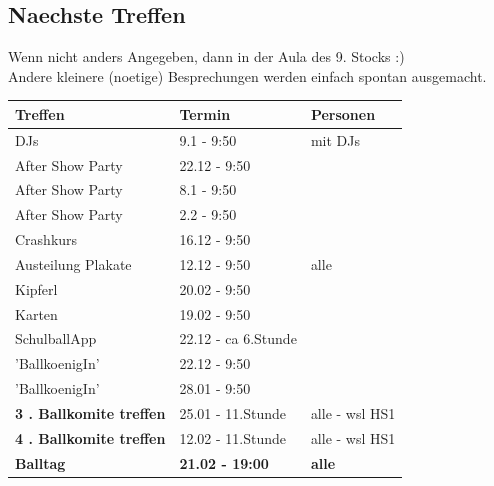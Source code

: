 \documentclass[12pt]{article}
\begin{document}
  \subsection{Naechste Treffen}
  Wenn nicht anders Angegeben, dann in der Aula des 9. Stocks :) \\
  Andere kleinere (noetige) Besprechungen werden einfach spontan ausgemacht. \\
 \begin{tabular}{ | p{} | p{} |  p{} |}
    \hline
\textbf{Treffen} & \textbf{Termin} & \textbf{Personen}  \\ 
    \hline 
    \hline

DJs & 9.1 - 9:50 & mit DJs \\ \hline
After Show Party & 22.12 - 9:50 &  \\ \hline
After Show Party & 8.1 - 9:50 &  \\ \hline
After Show Party & 2.2 - 9:50 &  \\ \hline
Crashkurs & 16.12 - 9:50 &  \\ \hline
Austeilung Plakate & 12.12 - 9:50 & alle \\ \hline
Kipferl  & 20.02 - 9:50 &  \\ \hline
Karten  & 19.02 - 9:50 &  \\ \hline
SchulballApp  & 22.12 - ca 6.Stunde &  \\ \hline
'BallkoenigIn'  & 22.12 - 9:50 &  \\ \hline
'BallkoenigIn'   & 28.01 - 9:50 &  \\ \hline
\textbf{3 . Ballkomite treffen}   & 25.01 - 11.Stunde & alle - wsl HS1 \\ \hline
\textbf{4 . Ballkomite treffen}   & 12.02 - 11.Stunde & alle - wsl HS1 \\ \hline
\textbf{Balltag}  & \textbf{21.02 - 19:00} & \textbf{alle} \\ \hline


  \end{tabular}
  \newpage
\end{document}
